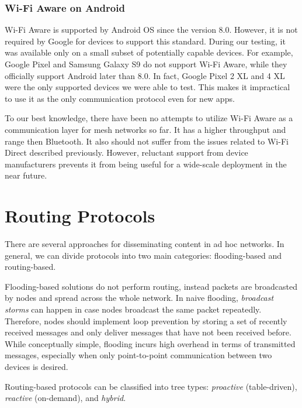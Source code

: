 \documentclass[conference,compsoc]{IEEEtran}
\begin{document}
\subsubsection{Wi-Fi Aware on Android}

Wi-Fi Aware is supported by Android OS since the version 8.0. However, it is not required by Google for devices to support this standard. During our testing, it was available only on a small subset of potentially capable devices. For example, Google Pixel and Samsung Galaxy S9 do not support Wi-Fi Aware, while they officially support Android later than 8.0. In fact, Google Pixel 2 XL and 4 XL were the only supported devices we were able to test. This makes it impractical to use it as the only communication protocol even for new apps.

To our best knowledge, there have been no attempts to utilize Wi-Fi Aware as a communication layer for mesh networks so far. It has a higher throughput and range then Bluetooth. It also should not suffer from the issues related to Wi-Fi Direct described previously. However, reluctant support from device manufacturers prevents it from being useful for a wide-scale deployment in the near future.


\section{Routing Protocols}\label{routing}



There are several approaches for disseminating content in ad hoc networks. In general, we can divide protocols into two main categories: flooding-based and routing-based.

Flooding-based solutions do not perform routing, instead packets are broadcasted by nodes and spread across the whole network. In naive flooding, \textit{broadcast storms} can happen in case nodes broadcast the same packet repeatedly. Therefore, nodes should implement loop prevention by storing a set of recently received messages and only deliver messages that have not been received before. \cite{flooding} While conceptually simple, flooding incurs high overhead in terms of transmitted messages, especially when only point-to-point communication between two devices is desired.

Routing-based protocols can be classified into tree types: \textit{proactive} (table-driven), \textit{reactive} (on-demand), and \textit{hybrid}.
\end{document}
